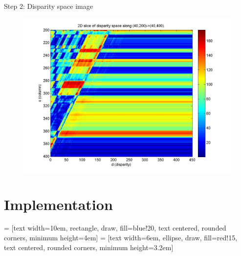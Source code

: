 \documentclass[10pt]{beamer}
\begin{document}
\begin{frame}[fragile]{Step 2: Disparity space image}
  \begin{figure}[h!]
    \centering
    \includegraphics[width=1.0\textwidth]{../paper/src/images/dsi.png}
  \end{figure}
\end{frame}

\section{Implementation}

 = [text width=10em, rectangle, draw, fill=blue!20, text centered, rounded corners, minimum height=4em]
 = [text width=6em, ellipse, draw, fill=red!15, text centered, rounded corners, minimum height=3.2em]
\end{document}
